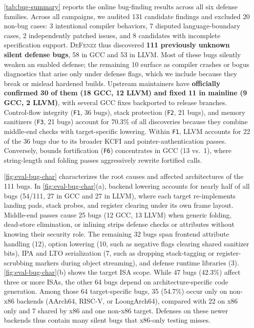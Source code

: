 \documentclass[conference,compsoc]{IEEEtran}
\begin{document}
\autoref{tab:bug-summary} reports the online bug-finding results across all six defense families. Across all campaigns, we audited 131 candidate findings and excluded 20 non-bug cases: 3 intentional compiler behaviors, 7 disputed language-boundary cases, 2 independently patched issues, and 8 candidates with incomplete specification support. \textsc{DeFenzz} thus discovered \textbf{111 previously unknown silent defense bugs}, 58 in GCC and 53 in LLVM. Most of these bugs silently weaken an enabled defense; the remaining 10 surface as compiler crashes or bogus diagnostics that arise only under defense flags, which we include because they break or mislead hardened builds. Upstream maintainers have \textbf{officially confirmed 30 of them (18 GCC, 12 LLVM) and fixed 11 in mainline (9 GCC, 2 LLVM)}, with several GCC fixes backported to release branches. Control-flow integrity (\texttt{F1}, 36 bugs), stack protection (\texttt{F2}, 21 bugs), and memory sanitizers (\texttt{F3}, 21 bugs) account for 70.3\% of all discoveries because they combine middle-end checks with target-specific lowering. Within \texttt{F1}, LLVM accounts for 22 of the 36 bugs due to its broader KCFI and pointer-authentication passes. Conversely, bounds fortification (\texttt{F6}) concentrates in GCC (13 vs.\ 1), where string-length and folding passes aggressively rewrite fortified calls.

\autoref{fig:eval-bug-char} characterizes the root causes and affected architectures of the 111 bugs. In \autoref{fig:eval-bug-char}(a), backend lowering accounts for nearly half of all bugs (54/111, 27 in GCC and 27 in LLVM), where each target re-implements landing pads, stack probes, and register clearing under its own frame layout. Middle-end passes cause 25 bugs (12 GCC, 13 LLVM) when generic folding, dead-store elimination, or inlining strips defense checks or attributes without knowing their security role. The remaining 32 bugs span frontend attribute handling (12), option lowering (10, such as negative flags clearing shared sanitizer bits), IPA and LTO serialization (7, such as dropping stack-tagging or register-scrubbing markers during object streaming), and defense runtime libraries (3). \autoref{fig:eval-bug-char}(b) shows the target ISA scope. While 47 bugs (42.3\%) affect three or more ISAs, the other 64 bugs depend on architecture-specific code generation. Among those 64 target-specific bugs, 35 (54.7\%) occur only on non-x86 backends (AArch64, RISC-V, or LoongArch64), compared with 22 on x86 only and 7 shared by x86 and one non-x86 target. Defenses on these newer backends thus contain many silent bugs that x86-only testing misses.
\end{document}
